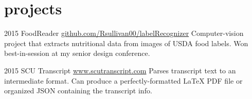 \documentclass[]{friggeri-cv} %
\begin{document}
\begin{entrylist}
%


\end{entrylist}


\section{projects}

\begin{entrylist}

\entry
{2015}
{FoodReader}
{\href{https://github.com/Rsullivan00/labelRecognizer}{github.com/Rsullivan00/labelRecognizer}}
{Computer-vision project that extracts nutritional data from images of USDA food labels. Won best-in-session at my senior design conference.}

\entry
{2015}
{SCU Transcript}
{\href{http://www.scutranscript.com}{www.scutranscript.com}}
{Parses transcript text to an intermediate format. Can produce a perfectly-formatted LaTeX PDF file or organized JSON containing the transcript info.}


\end{entrylist}
\end{document}
